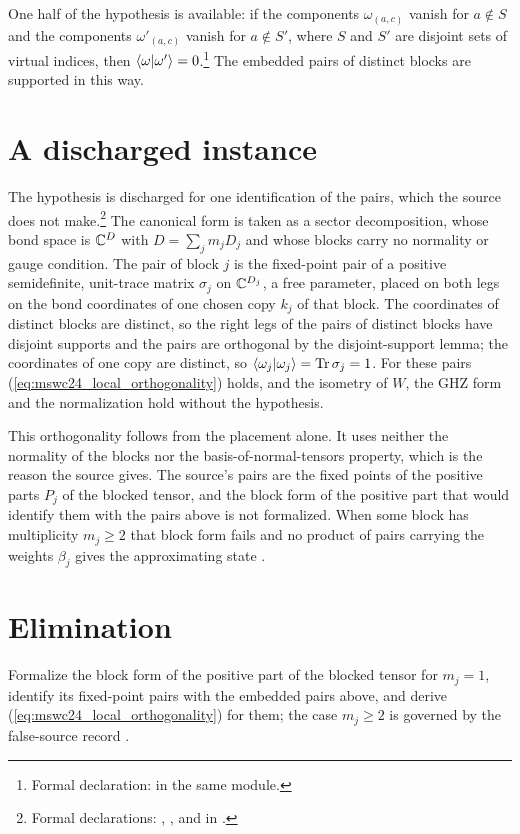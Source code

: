 \documentclass{article}
\begin{document}
One half of the hypothesis is available: if the components $\omega_{(a,c)}$ vanish
for $a\notin S$ and the components $\omega'_{(a,c)}$ vanish for $a\notin S'$,
where $S$ and $S'$ are disjoint sets of virtual indices, then $\langle \omega | \omega' \rangle=0$.\footnote{Formal declaration:
     in the same module.}
The embedded pairs of distinct blocks are supported in this way.

\section{A discharged instance}
The hypothesis is discharged for one identification of the pairs, which the
source does not make.\footnote{Formal declarations:
    ,
    ,
    and  in
    .}
The canonical form is taken as a sector decomposition, whose bond space is
$\mathbb{C}^D$ with $D=\sum_jm_jD_j$ and whose blocks carry no normality or gauge
condition. The pair of block $j$ is the fixed-point pair of a positive
semidefinite, unit-trace matrix $\sigma_j$ on $\mathbb{C}^{D_j}$, a free parameter,
placed on both legs on the bond coordinates of one chosen copy $k_j$ of that
block. The coordinates of distinct blocks are distinct, so the right legs of
the pairs of distinct blocks have disjoint supports and the pairs are
orthogonal by the disjoint-support lemma; the coordinates of one copy are
distinct, so $\langle \omega_j | \omega_j \rangle=\operatorname{Tr}\sigma_j=1$. For
these pairs (\ref{eq:mswc24_local_orthogonality}) holds, and the isometry of
$W$, the GHZ form and the normalization hold without the hypothesis.

This orthogonality follows from the placement alone. It uses neither the
normality of the blocks nor the basis-of-normal-tensors property, which is the
reason the source gives. The source's pairs are the fixed points of the
positive parts $P_j$ of the blocked tensor, and the block form of the positive
part that would identify them with the pairs above is not formalized. When some
block has multiplicity $m_j\ge2$ that block form fails and no product of pairs
carrying the weights $\beta_j$ gives the approximating state
\cite{gap:mswc24_multiplicity_fixed_point}.

\section{Elimination}
Formalize the block form of the positive part of the blocked tensor for
$m_j=1$, identify its fixed-point pairs with the embedded pairs above, and
derive (\ref{eq:mswc24_local_orthogonality}) for them; the case $m_j\ge2$ is
governed by the false-source record
\cite{gap:mswc24_multiplicity_fixed_point}.



\end{document}
